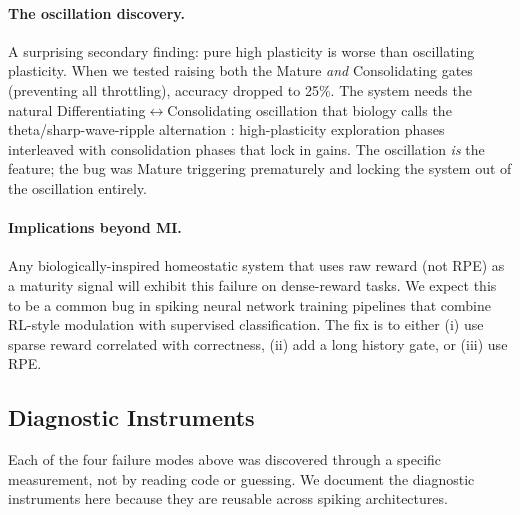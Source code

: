\paragraph{The oscillation discovery.}
A surprising secondary finding: pure high plasticity is worse than oscillating plasticity. When we tested raising both the Mature \emph{and} Consolidating gates (preventing all throttling), accuracy dropped to 25\%. The system needs the natural Differentiating$\leftrightarrow$Consolidating oscillation that biology calls the theta/sharp-wave-ripple alternation \cite{buzsaki2015hippocampal}: high-plasticity exploration phases interleaved with consolidation phases that lock in gains. The oscillation \emph{is} the feature; the bug was Mature triggering prematurely and locking the system out of the oscillation entirely.

\paragraph{Implications beyond MI.}
Any biologically-inspired homeostatic system that uses raw reward (not RPE) as a maturity signal will exhibit this failure on dense-reward tasks. We expect this to be a common bug in spiking neural network training pipelines that combine RL-style modulation with supervised classification. The fix is to either (i) use sparse reward correlated with correctness, (ii) add a long history gate, or (iii) use RPE.

\subsection{Diagnostic Instruments}
\label{sec:diagnostics}

Each of the four failure modes above was discovered through a specific measurement, not by reading code or guessing. We document the diagnostic instruments here because they are reusable across spiking architectures.


